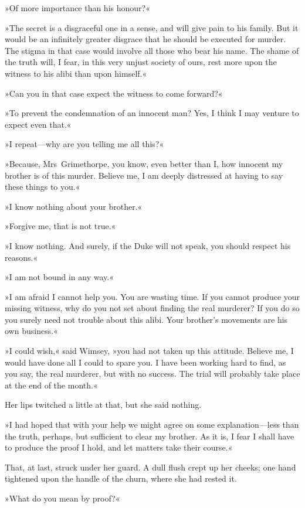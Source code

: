 »Of more importance than his honour?«

»The secret is a disgraceful one in a sense, and will give pain to his family. But it would be an infinitely greater disgrace that he should be executed for murder. The stigma in that case would involve all those who bear his name. The shame of the truth will, I fear, in this very unjust society of ours, rest more upon the witness to his alibi than upon himself.«

»Can you in that case expect the witness to come forward?«

»To prevent the condemnation of an innocent man? Yes, I think I may venture to expect even that.«

»I repeat—why are you telling me all this?«

»Because, Mrs~Grimethorpe, you know, even better than I, how innocent my brother is of this murder. Believe me, I am deeply distressed at having to say these things to you.«

»I know nothing about your brother.«

»Forgive me, that is not true.«

»I know nothing. And surely, if the Duke will not speak, you should respect his reasons.«

»I am not bound in any way.«

»I am afraid I cannot help you. You are wasting time. If you cannot produce your missing witness, why do you not set about finding the real murderer? If you do so you surely need not trouble about this alibi.  Your brother's movements are his own business.«

»I could wish,« said Wimsey, »you had not taken up this attitude.  Believe me, I would have done all I could to spare you. I have been working hard to find, as you say, the real murderer, but with no success. The trial will probably take place at the end of the month.«

Her lips twitched a little at that, but she said nothing.

»I had hoped that with your help we might agree on some explanation—less than the truth, perhaps, but sufficient to clear my brother. As it is, I fear I shall have to produce the proof I hold, and let matters take their course.«

That, at last, struck under her guard. A dull flush crept up her cheeks; one hand tightened upon the handle of the churn, where she had rested it.

»What do you mean by proof?«

